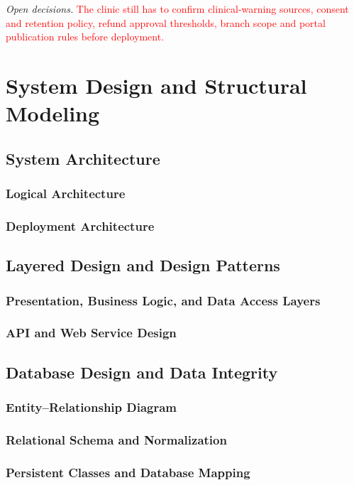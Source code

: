 \documentclass[a4paper,12pt]{article}
\newcommand{\weak}[1]{\textcolor{red}{#1}}
\begin{document}
\textit{Open decisions.} \weak{The clinic still has to confirm clinical-warning sources, consent and retention policy, refund approval thresholds, branch scope and portal publication rules before deployment.}


\section{System Design and Structural Modeling}

\subsection{System Architecture}
\subsubsection{Logical Architecture}
\subsubsection{Deployment Architecture}

\subsection{Layered Design and Design Patterns}
\subsubsection{Presentation, Business Logic, and Data Access Layers}
\subsubsection{API and Web Service Design}

\subsection{Database Design and Data Integrity}
\subsubsection{Entity--Relationship Diagram}
\subsubsection{Relational Schema and Normalization}
\subsubsection{Persistent Classes and Database Mapping}
\end{document}
